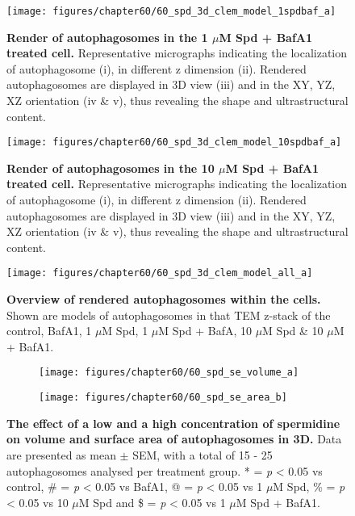\begin{figure}[!htbp]
\center
 \texttt{[image: figures/chapter60/60\_spd\_3d\_clem\_model\_1spdbaf\_a]}
 \caption[Render of autophagosomes in the 1 $\mu$M Spd + BafA1 treated cell]{\textbf{Render of autophagosomes in the 1 $\mu$M Spd + BafA1 treated cell.} Representative micrographs indicating the localization of autophagosome (i), in different z dimension (ii). Rendered autophagosomes are displayed in 3D view (iii) and in the XY, YZ, XZ orientation (iv \& v), thus revealing the shape and ultrastructural content.}
 \label{fig:60_spd_3d_clem_model_1spdbaf_a}
\end{figure} 

\begin{figure}[!htbp]
\center
 \texttt{[image: figures/chapter60/60\_spd\_3d\_clem\_model\_10spdbaf\_a]}
 \caption[Render of autophagosomes in the 10 $\mu$M Spd + BafA1 treated cell]{\textbf{Render of autophagosomes in the 10 $\mu$M Spd + BafA1 treated cell.} Representative micrographs indicating the localization of autophagosome (i), in different z dimension (ii). Rendered autophagosomes are displayed in 3D view (iii) and in the XY, YZ, XZ orientation (iv \& v), thus revealing the shape and ultrastructural content.}
 \label{fig:60_spd_3d_clem_model_10spdbaf_a}
\end{figure} 

\begin{landscape}
\begin{figure}[!htbp]
\center
 \texttt{[image: figures/chapter60/60\_spd\_3d\_clem\_model\_all\_a]}
 \caption[Overview of rendered autophagosomes within the cells]{\textbf{Overview of rendered autophagosomes within the cells.} Shown are models of autophagosomes in that TEM z-stack of the control, BafA1, 1 $\mu$M Spd, 1 $\mu$M Spd + BafA, 10 $\mu$M Spd \& 10 $\mu$M + BafA1.}
 \label{fig:60_spd_3d_clem_model_all_a}
\end{figure} 
\end{landscape}

\begin{figure}[!htbp]
 \begin{subfigure}[b]{0.495\linewidth}
  \texttt{[image: figures/chapter60/60\_spd\_se\_volume\_a]}
 \end{subfigure}
 \begin{subfigure}[b]{0.495\linewidth}
  \texttt{[image: figures/chapter60/60\_spd\_se\_area\_b]}
 \end{subfigure}
  \caption[The effect of a low and a high concentration of spermidine on volume and surface area of autophagosomes in 3D]{\textbf{The effect of a low and a high concentration of spermidine on volume and surface area of autophagosomes in 3D.} Data are presented as mean $\pm$ SEM, with a total of 15 - 25 autophagosomes analysed per treatment group. * = \textit{p} < 0.05 vs control, \# = \textit{p} < 0.05 vs BafA1, @ = \textit{p} < 0.05 vs 1 $\mu$M Spd, \% = \textit{p} < 0.05 vs 10 $\mu$M Spd and \$ = \textit{p} < 0.05 vs 1 $\mu$M Spd + BafA1.}
 \label{fig:60_spd_se_volume_a}
\end{figure}

